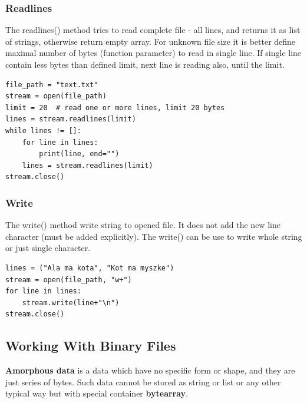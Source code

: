 \documentclass{article}
\begin{document}
\subsubsection{Readlines}
The readlines() method tries to read complete file - all lines, and returns it as list of strings, otherwise return empty array. For unknown file size it is better define maximal number of bytes (function parameter) to read in single line. If single line contain less bytes than defined limit, next line is reading also, until the limit.
\begin{lstlisting}[style=pystyle]
file_path = "text.txt"
stream = open(file_path)
limit = 20  # read one or more lines, limit 20 bytes
lines = stream.readlines(limit)
while lines != []:
    for line in lines:
        print(line, end="")
    lines = stream.readlines(limit) 
stream.close()
\end{lstlisting}

\subsubsection{Write}
The write() method write string to opened file. It does not add the new line character (must be added explicitly). The write() can be use to write whole string or just single character.
\begin{lstlisting}[style=pystyle]
lines = ("Ala ma kota", "Kot ma myszke")
stream = open(file_path, "w+")
for line in lines:
    stream.write(line+"\n")
stream.close()
\end{lstlisting}


\subsection{Working With Binary Files}
\textbf{Amorphous data} is a data which have no specific form or shape, and they are just series of bytes. Such data cannot be stored as string or list or any other typical way but with special container \textbf{bytearray}.
\end{document}
